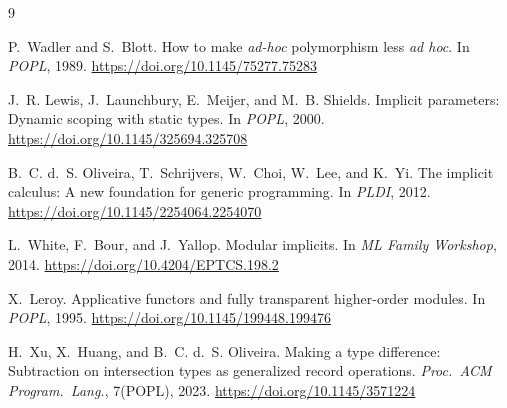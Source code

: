 \documentclass[10pt]{article}
\theoremstyle{plain}
\theoremstyle{remark}
\begin{document}
\begin{thebibliography}{9}\small

P.~Wadler and S.~Blott.
\newblock How to make \emph{ad-hoc} polymorphism less \emph{ad hoc}.
\newblock In \emph{POPL}, 1989.
\newblock \url{https://doi.org/10.1145/75277.75283}

J.~R. Lewis, J.~Launchbury, E.~Meijer, and M.~B. Shields.
\newblock Implicit parameters: Dynamic scoping with static types.
\newblock In \emph{POPL}, 2000.
\newblock \url{https://doi.org/10.1145/325694.325708}

B.~C. d.~S. Oliveira, T.~Schrijvers, W.~Choi, W.~Lee, and K.~Yi.
\newblock The implicit calculus: A new foundation for generic programming.
\newblock In \emph{PLDI}, 2012.
\newblock \url{https://doi.org/10.1145/2254064.2254070}

L.~White, F.~Bour, and J.~Yallop.
\newblock Modular implicits.
\newblock In \emph{ML Family Workshop}, 2014.
\newblock \url{https://doi.org/10.4204/EPTCS.198.2}

X.~Leroy.
\newblock Applicative functors and fully transparent higher-order modules.
\newblock In \emph{POPL}, 1995.
\newblock \url{https://doi.org/10.1145/199448.199476}

H.~Xu, X.~Huang, and B.~C. d.~S. Oliveira.
\newblock Making a type difference: Subtraction on intersection types as
  generalized record operations.
\newblock \emph{Proc.\ ACM Program.\ Lang.}, 7(POPL), 2023.
\newblock \url{https://doi.org/10.1145/3571224}

\end{thebibliography}
\end{document}
